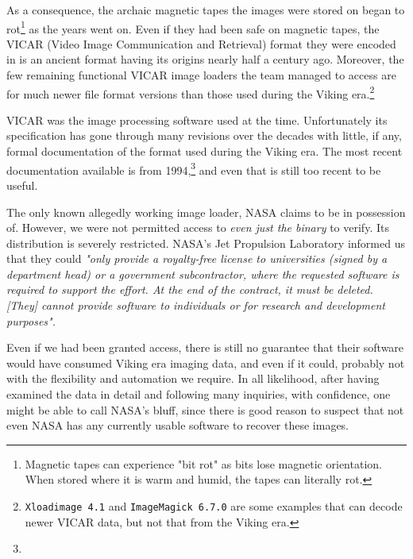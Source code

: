     {}

As a consequence, the archaic magnetic tapes the images were stored on began to rot\footnote{Magnetic tapes can experience "bit rot" as bits lose magnetic orientation. When stored where it is warm and humid, the tapes can literally rot.} as the years went on. Even if they had been safe on magnetic tapes, the VICAR (Video Image Communication and Retrieval) format they were encoded in is an ancient format having its origins nearly half a century ago. Moreover, the few remaining functional VICAR image loaders the team managed to access are for much newer file format versions than those used during the Viking era.\footnote{{\tt Xloadimage 4.1} and {\tt ImageMagick 6.7.0} are some examples that can decode newer VICAR data, but not that from the Viking era.}

VICAR was the image processing software used at the time. Unfortunately its specification has gone through many revisions over the decades with little, if any, formal documentation of the format used during the Viking era. The most recent documentation available is from 1994,\footnote{} and even that is still too recent to be useful.

The only known allegedly working image loader, NASA claims to be in possession of. However, we were not permitted access to {\it even just the binary} to verify. Its distribution is severely restricted. NASA's Jet Propulsion Laboratory informed us that they could {\it "only provide a royalty-free license to universities (signed by a department head) or a government subcontractor, where the requested software is required to support the effort. At the end of the contract, it must be deleted. [They] cannot provide software to individuals or for research and development purposes".} 

Even if we had been granted access, there is still no guarantee that their software would have consumed Viking era imaging data, and even if it could, probably not with the flexibility and automation we require. In all likelihood, after having examined the data in detail and following many inquiries, with confidence, one might be able to call NASA's bluff, since there is good reason to suspect that not even NASA has any currently usable software to recover these images.

